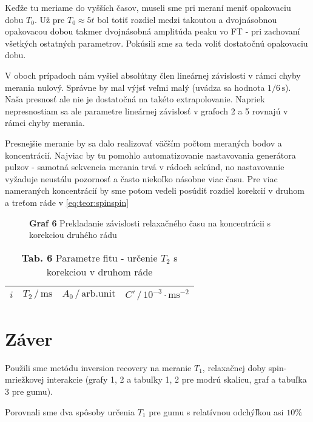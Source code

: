 \documentclass[a4paper, 10pt]{article}
\newcommand{\unit}[1]{\ensuremath{\, \mathrm{#1}}}
\begin{document}
Keďže tu meriame do vyšších časov, museli sme pri meraní meniť opakovaciu dobu $T_0$. Už pre $T_0 \approx 5t$ bol totiť rozdiel medzi takoutou a dvojnásobnou opakovacou dobou takmer dvojnásobná amplitúda peaku vo FT - pri zachovaní všetkých ostatných parametrov. Pokúsili sme sa teda voliť dostatočnú opakovaciu dobu.

V oboch prípadoch nám vyšiel absolútny člen lineárnej závislosti v rámci chyby merania nulový. Správne by mal výjsť veľmi malý (uvádza sa hodnota $1/6\unit s$). Naša presnosť ale nie je dostatočná na takéto extrapolovanie.  Napriek nepresnostiam sa ale parametre lineárnej závislosť v grafoch 2 a 5 rovnajú v rámci chyby merania.

Presnejšie meranie by sa dalo realizovať väčším počtom meraných bodov a koncentrácií. Najviac by tu pomohlo automatizovanie nastavovania generátora pulzov - samotná sekvencia merania trvá v rádoch sekúnd, no nastavovanie vyžaduje neustálu pozornosť a často niekoľko násobne viac času. Pre viac nameraných koncentrácií by sme potom vedeli posúdiť rozdiel korekcií v druhom a treťom ráde v \ref{eq:teor:spinspin}

\begin{figure}[h!]
\centering
\vspace*{-15pt}

\textbf{Graf 6} Prekladanie závislosti relaxačného času na koncentrácii s korekciou druhého rádu 
\end{figure}

\begin{table}[t]    
\centering
\hspace*{30pt}
\begin{tabular}{c|c|c|c}
$ i $ & 
$ T_2\,/\unit{ms}$ &
$ A_0\,/\unit{arb. unit}$ &
$ C'\,/\unit{10^{-3}\cdot ms^{-2}}$ 
\\
\midrule 

\end{tabular}
\newline
\vspace*{2pt}
\caption*{\textbf{ Tab. 6} Parametre fitu - určenie $T_2$ s korekciou v druhom ráde}
\end{table}
\section*{Záver}
Použili sme metódu inversion recovery na meranie $T_1$, relaxačnej doby spin-mriežkovej interakcie (grafy 1, 2 a tabuľky 1, 2 pre modrú skalicu, graf a tabuľka 3 pre gumu). 

Porovnali sme dva spôsoby určenia $T_1$ pre gumu s relatívnou odchýľkou asi $10\%$
\end{document}
